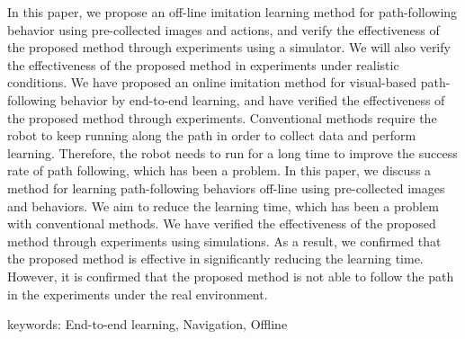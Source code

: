 In this paper, we propose an off-line imitation learning method for path-following behavior using pre-collected images and actions, and verify the effectiveness of the proposed method through experiments using a simulator. We will also verify the effectiveness of the proposed method in experiments under realistic conditions. We have proposed an online imitation method for visual-based path-following behavior by end-to-end learning, and have verified the effectiveness of the proposed method through experiments. Conventional methods require the robot to keep running along the path in order to collect data and perform learning. Therefore, the robot needs to run for a long time to improve the success rate of path following, which has been a problem. In this paper, we discuss a method for learning path-following behaviors off-line using pre-collected images and behaviors. We aim to reduce the learning time, which has been a problem with conventional methods. We have verified the effectiveness of the proposed method through experiments using simulations. As a result, we confirmed that the proposed method is effective in significantly reducing the learning time. However, it is confirmed that the proposed method is not able to follow the path in the experiments under the real environment. 

\vspace{10mm}
keywords: End-to-end learning, Navigation, Offline 
